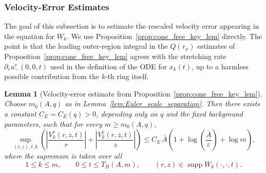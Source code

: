 \documentclass[reqno,11pt]{amsart}
\newtheorem{lemma}[theorem]{Lemma}
\newcommand{\supp}{\operatorname{supp}}
\begin{document}
\subsubsection{Velocity-Error Estimates}
\label{sec:bftrv_new}

The goal of this subsection is to estimate the rescaled velocity error
appearing in the equation for \(W_k\).  We
use Proposition~\ref{prop:cone_free_key_lem} directly.  The point
is that the leading outer-region integral in the $Q(r_x)$ estimates of Proposition~\ref{prop:cone_free_key_lem} agrees with the
stretching rate \(\partial_r u_-^r(0,0,t)\) used in the definition of the
ODE for \(x_k(t)\), up to a harmless possible contribution from the \(k\)-th
ring itself.

\begin{lemma}[Velocity-error estimate from Proposition~\ref{prop:cone_free_key_lem}]
\label{lem:in_out_cont_updated}
\label{lem:asymptotic_integral_bound_updated}
\label{lem:Euler_Vk_grad_u_updated}
Choose \(m_0(A,q)\) as in Lemma~\ref{lem:Euler_scale_separation}.
Then there exists a constant \(C_E=C_E(q)>0\), depending only on \(q\) and the fixed
background parameters, such that for every \(m\ge m_0(A,q)\),
\begin{equation}
\label{eq:desired_bd_res_vel_updated}
\sup_{(r,z),t,k}
\left(
\left|
\frac{V_k^r(r,z,t)}{r}
\right|
+
\left|
\frac{V_k^z(r,z,t)}{z}
\right|
\right)
\le
C_E\,\bar A
\left(
1+\log\left(\frac{\bar A}{\varepsilon}\right)+\log m
\right),
\end{equation}
where the supremum is taken over all
\[
1\le k\le m,\qquad
0\le t\le T_B(A,m),\qquad
(r,z)\in\supp W_k(\cdot,\cdot,t).
\]
\end{lemma}
\end{document}
